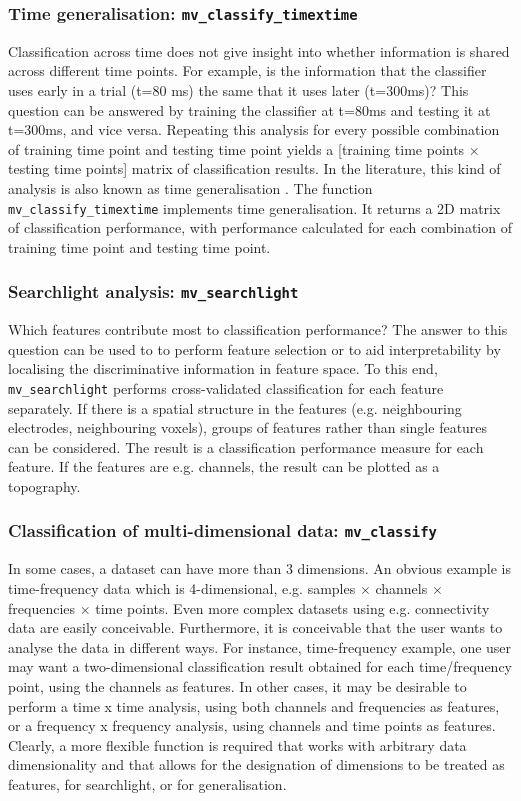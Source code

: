 \documentclass[utf8]{frontiersSCNS} %
\newcommand{\ttt}[1]{\texttt{#1}}
\begin{document}
\subsubsection{Time generalisation: \ttt{mv\_classify\_timextime}}

Classification across time does not give insight into whether information is shared across different time points. For example, is the information that the classifier uses early in a trial (t=80 ms) the same that it uses later (t=300ms)? This question can be answered by training the classifier at t=80ms and testing it at t=300ms, and vice versa. Repeating this analysis for every possible combination of training time point and testing time point yields a [training time points $\times$ testing time points] matrix of classification results. In the literature, this kind of analysis is also known as time generalisation \cite{King2014}. The function  \ttt{mv\_classify\_timextime} implements time generalisation. It returns a 2D matrix of classification performance, with performance calculated for each combination of training time point and testing time point.

\subsubsection{Searchlight analysis:  \ttt{mv\_searchlight}}

Which features contribute most to classification performance? The answer to this question can be used to to perform feature selection or to aid interpretability by localising the discriminative information in feature space. To this end, \ttt{mv\_searchlight} performs cross-validated classification for each feature separately. If there is a spatial structure in the features (e.g. neighbouring electrodes, neighbouring voxels), groups of features rather than single features can be considered. The result is a classification performance measure for each feature. If the features are e.g. channels, the result can be plotted as a topography.


\subsubsection{Classification of multi-dimensional data: \ttt{mv\_classify}}

In some cases, a dataset can have more than 3 dimensions. An obvious example is time-frequency data which is 4-dimensional, e.g. samples $\times$ channels  $\times$ frequencies $\times$ time points. Even more complex datasets using e.g. connectivity data are easily conceivable. Furthermore, it is conceivable that the user wants to analyse the data in different ways. For instance, time-frequency example, one user may want a two-dimensional classification result obtained for each time/frequency point, using the channels as features. In other cases, it may be desirable to perform a time x time analysis, using both channels and frequencies as features, or a frequency x frequency analysis, using channels and time points as features. Clearly, a more flexible function is required that works with arbitrary data dimensionality and that allows for the designation of dimensions to be treated as features, for searchlight, or for generalisation.
\end{document}
